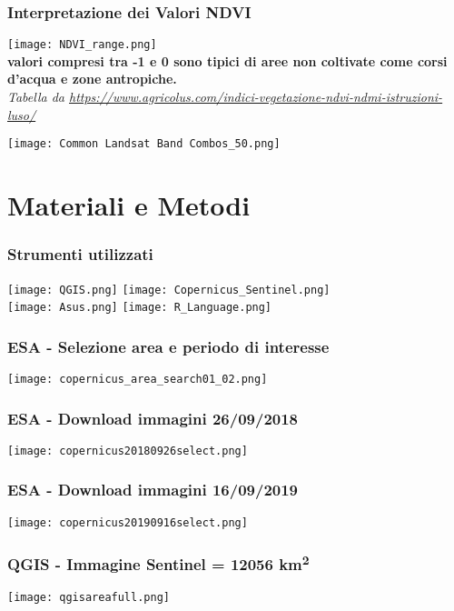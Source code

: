 \documentclass{beamer}
\begin{document}
\begin{frame}
\frametitle{Interpretazione dei Valori NDVI}
\centering
\texttt{[image: NDVI\_range.png]} \\
\tiny{\textbf{valori compresi tra -1 e 0 sono tipici di aree non coltivate come corsi d’acqua e zone antropiche.} \\
\textit{Tabella da \url{https://www.agricolus.com/indici-vegetazione-ndvi-ndmi-istruzioni-luso/}}}
\end{frame}

\begin{frame}
\centering
\texttt{[image: Common Landsat Band Combos\_50.png]}
\end{frame}

\section{Materiali e Metodi}
\begin{frame}
\frametitle{Strumenti utilizzati}
\centering
\texttt{[image: QGIS.png]}
\texttt{[image: Copernicus\_Sentinel.png]} \\
\texttt{[image: Asus.png]}
\texttt{[image: R\_Language.png]}
\end{frame}

\begin{frame}
\frametitle{ESA - Selezione area e periodo di interesse}
\centering
\texttt{[image: copernicus\_area\_search01\_02.png]}
\end{frame}

\begin{frame}
\frametitle{ESA - Download immagini 26/09/2018}
\centering
\texttt{[image: copernicus20180926select.png]}
\end{frame}

\begin{frame}
\frametitle{ESA - Download immagini 16/09/2019}
\centering
\texttt{[image: copernicus20190916select.png]}
\end{frame}

\begin{frame}
\frametitle{QGIS - Immagine Sentinel = 12056 km\textsuperscript{2}}
\centering
\texttt{[image: qgisareafull.png]}
\end{frame}
\end{document}
